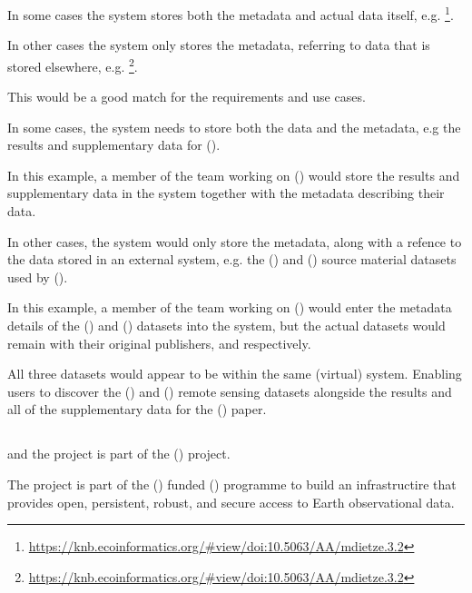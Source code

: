 \documentclass{article}
\begin{document}
In some cases the \cite{metacat} system stores both the metadata and actual
data itself, e.g.
\footnote{\url{https://knb.ecoinformatics.org/#view/doi:10.5063/AA/mdietze.3.2}}.

In other cases the \cite{metacat} system only stores the metadata, referring
to data that is stored elsewhere, e.g.
\footnote{\url{https://knb.ecoinformatics.org/#view/doi:10.5063/AA/mdietze.3.2}}.

This would be a good match for the \cite{trop} requirements and use cases.

In some cases, the \cite{trop} system needs to store both the data and the
metadata, e.g the results and supplementary data for (\cite{mitchard-2014}).

In this example, a member of the team working on (\cite{mitchard-2014})
would store the results and supplementary data in the \cite{trop} system
together with the metadata describing their data.

In other cases, the \cite{trop} system would only store the metadata,
along with a refence to the data stored in an external system, e.g. the
(\cite{saatchi-2011}) and (\cite{baccini-2012}) source material datasets
used by (\cite{mitchard-2014}).

In this example, a member of the team working on (\cite{mitchard-2014})
would enter the metadata details of the (\cite{saatchi-2011}) and
(\cite{baccini-2012}) datasets into the \cite{trop} system, but
the actual datasets would remain with their original publishers,
 and  respectively.

All three datasets would appear to be within the same (virtual)
system. Enabling \cite{trop} users to discover the (\cite{saatchi-2011})
and (\cite{baccini-2012}) remote sensing datasets alongside the results
and all of the supplementary data for the (\cite{mitchard-2014}) paper.

\subsection{}

\cite{metacat} and the \cite{knb} project is part of the  (\cite{data-one})
project.

The \cite{data-one} project is part of the  (\cite{nsf})
funded  (\cite{data-net}) programme to build an
infrastructire that provides open, persistent, robust, and secure access
to Earth observational data.
 
\end{document}
